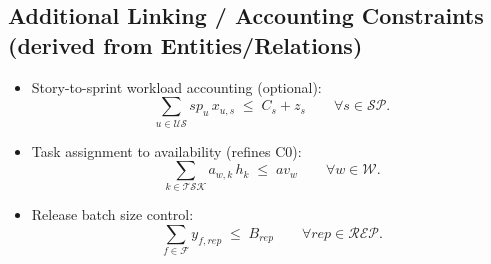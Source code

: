 \documentclass[11pt,a4paper]{article}
\begin{document}
\subsection*{Additional Linking / Accounting Constraints (derived from Entities/Relations)}
\begin{itemize}[leftmargin=1.2cm]
  \item Story-to-sprint workload accounting (optional):
  \[
    \sum_{u\in\mathcal{US}} sp_u\,x_{u,s} \;\le\; C_s + z_s \qquad \forall s\in\mathcal{SP}.
  \]
  \item Task assignment to availability (refines C0):
  \[
    \sum_{k\in\mathcal{TSK}} a_{w,k}\,h_k \;\le\; av_w \qquad \forall w\in\mathcal{W}.
  \]
  \item Release batch size control:
  \[
    \sum_{f\in\mathcal{F}} y_{f,rep} \;\le\; B_{rep} \qquad \forall rep\in\mathcal{REP}.
  \]
\end{itemize}
\end{document}
